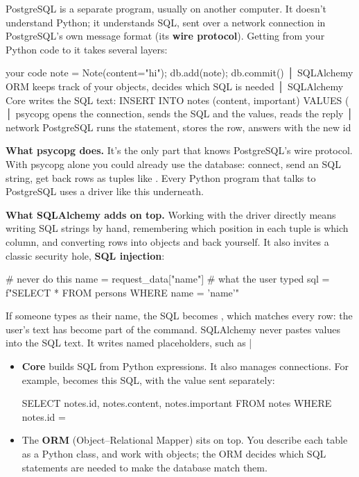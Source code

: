PostgreSQL is a separate program, usually on another computer. It doesn't understand Python; it understands SQL, sent over a network connection in PostgreSQL's own message format (its \textbf{wire protocol}). Getting from your Python code to it takes several layers:

\begin{code}
your code         note = Note(content="hi"); db.add(note); db.commit()
   │
SQLAlchemy ORM    keeps track of your objects, decides which SQL is needed
   │
SQLAlchemy Core   writes the SQL text:  INSERT INTO notes (content, important)
                  VALUES (%
   │
psycopg           opens the connection, sends the SQL and the values, reads the reply
   │  network
PostgreSQL        runs the statement, stores the row, answers with the new id
\end{code}

\textbf{What psycopg does.} It's the only part that knows PostgreSQL's wire protocol. With psycopg alone you could already use the database: connect, send an SQL string, get back rows as tuples like . Every Python program that talks to PostgreSQL uses a driver like this underneath.

\textbf{What SQLAlchemy adds on top.} Working with the driver directly means writing SQL strings by hand, remembering which position in each tuple is which column, and converting rows into objects and back yourself. It also invites a classic security hole, \textbf{SQL injection}:

\begin{py}
# never do this
name = request_data["name"]                # what the user typed
sql = f"SELECT * FROM persons WHERE name = '{name}'"
\end{py}

If someone types  as their name, the SQL becomes , which matches every row: the user's text has become part of the command. SQLAlchemy never pastes values into the SQL text. It writes named placeholders, such as \icode|%

\begin{itemize}
\item \textbf{Core} builds SQL from Python expressions. It also manages connections. For example,  becomes this SQL, with the value  sent separately:
\begin{code}
SELECT notes.id, notes.content, notes.important FROM notes WHERE notes.id = %
\end{code}
\item The \textbf{ORM} (Object--Relational Mapper) sits on top. You describe each table as a Python class, and work with objects; the ORM decides which SQL statements are needed to make the database match them.
\end{itemize}

